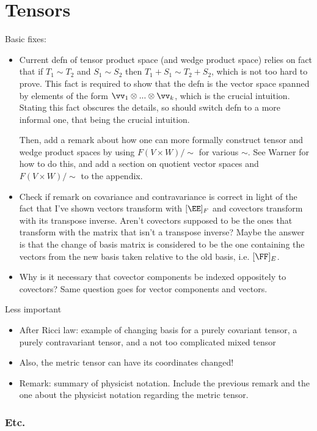 \section*{Tensors}

Basic fixes:

\begin{itemize}
    \item Current defn of tensor product space (and wedge product space) relies on fact that if $T_1 \sim T_2$ and $S_1 \sim S_2$ then $T_1 + S_1 \sim T_2 + S_2$, which is not too hard to prove. This fact is required to show that the defn is the vector space spanned by elements of the form $\vv_1 \otimes ... \otimes \vv_k$, which is the crucial intuition. Stating this fact obscures the details, so should switch defn to a more informal one, that being the crucial intuition.

	Then, add a remark about how one can more formally construct tensor and wedge product spaces by using $F(V \times W)/\sim$ for various $\sim$. See Warner for how to do this, and add a section on quotient vector spaces and $F(V \times W)/\sim$ to the appendix. 
    \item Check if remark on covariance and contravariance is correct in light of the fact that I’ve shown vectors transform with $[\EE]_F$ and covectors transform with its transpose inverse. Aren’t covectors supposed to be the ones that transform with the matrix that isn’t a transpose inverse? Maybe the answer is that the change of basis matrix is considered to be the one containing the vectors from the new basis taken relative to the old basis, i.e. $[\FF]_E$.
    \item Why is it necessary that covector components be indexed oppositely to covectors? Same question goes for vector components and vectors.
\end{itemize}

Less important
\begin{itemize}
    \item After Ricci law: example of changing basis for a purely covariant tensor, a purely contravariant tensor, and a not too complicated mixed tensor
    \item Also, the metric tensor can have its coordinates changed!
    \item Remark: summary of physicist notation. Include the previous remark and the one about the physicist notation regarding the metric tensor.
\end{itemize}

\subsubsection*{Etc.}

